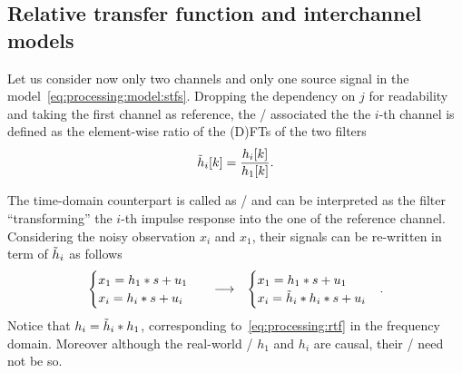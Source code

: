 \subsection{Relative transfer function and interchannel models}
Let us consider now only two channels and only one source signal in the model~\cref{eq:processing:model:stfs}.
Dropping the dependency on $j$ for readability and taking the first channel as reference, the \RTFdef/ associated the the $i$-th channel is defined as
the element-wise ratio of the (D)FTs of the two filters~
\begin{equation}\label{eq:processing:rtf}
    \tilde{h}_i[k] = \frac{h_i[k]}{h_1[k]}
    .
\end{equation}

The time-domain counterpart is called as \ReIRdef/ and can be interpreted as the filter ``transforming'' the $i$-th impulse response into the one of the reference channel.
Considering the noisy observation $x_i$ and $x_1$, their signals can be re-written in term of $\tilde{h}_i$ as follows
\begin{equation}
    \begin{matrix}
    \begin{cases}
        x_1 = h_1 \ast s + u_1 \\
        x_i = h_i \ast s + u_i
    \end{cases} & \longrightarrow  & \begin{cases}
        x_1 = h_1 \ast s + u_1 \\
        x_i = \tilde{h}_i \ast h_i \ast s + u_i
    \end{cases}
    \end{matrix}
    .
\end{equation}
Notice that $h_i = \tilde{h}_i \ast h_1$, corresponding to~\cref{eq:processing:rtf} in the frequency domain.
Moreover although the real-world \RIRs/ $h_1$ and $h_i$ are causal, their \RTF/ need not be so.

